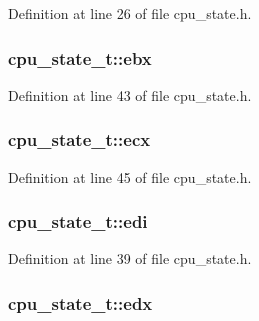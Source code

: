 \-Definition at line 26 of file cpu\-\_\-state.\-h.

\hypertarget{structcpu__state__t_ac22dd647fdb5ef040f91a51057828af3}{
\subsubsection[{ebx}]{ {\bf cpu\-\_\-state\-\_\-t\-::ebx}}}\label{structcpu__state__t_ac22dd647fdb5ef040f91a51057828af3}


\-Definition at line 43 of file cpu\-\_\-state.\-h.

\hypertarget{structcpu__state__t_ae8530eeb4e0c97c3e3694ce9346506ba}{
\subsubsection[{ecx}]{ {\bf cpu\-\_\-state\-\_\-t\-::ecx}}}\label{structcpu__state__t_ae8530eeb4e0c97c3e3694ce9346506ba}


\-Definition at line 45 of file cpu\-\_\-state.\-h.

\hypertarget{structcpu__state__t_a381129dc13b5515ebe6c894d270106a5}{
\subsubsection[{edi}]{ {\bf cpu\-\_\-state\-\_\-t\-::edi}}}\label{structcpu__state__t_a381129dc13b5515ebe6c894d270106a5}


\-Definition at line 39 of file cpu\-\_\-state.\-h.

\hypertarget{structcpu__state__t_ad821c98f8125278fc372cb3719e3a406}{
\subsubsection[{edx}]{ {\bf cpu\-\_\-state\-\_\-t\-::edx}}}\label{structcpu__state__t_ad821c98f8125278fc372cb3719e3a406}


